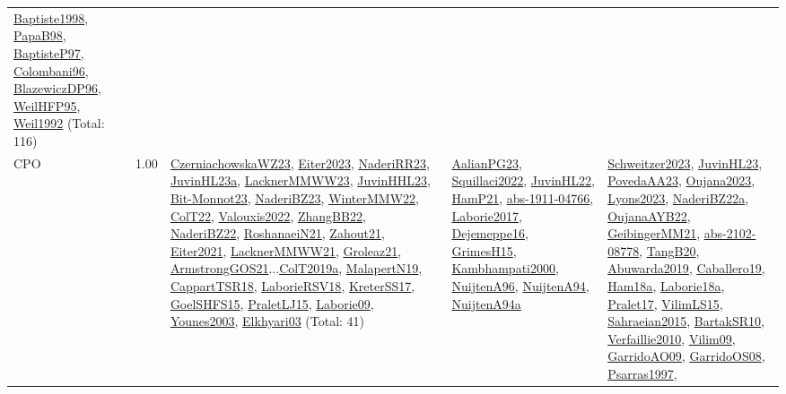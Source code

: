 {\begin{longtable}{p{3cm}r>{\raggedright\arraybackslash}p{6cm}>{\raggedright\arraybackslash}p{6cm}>{\raggedright\arraybackslash}p{8cm}}
\hyperref[detail:Baptiste1998]{Baptiste1998}, \hyperref[detail:PapaB98]{PapaB98}, \hyperref[detail:BaptisteP97]{BaptisteP97}, \hyperref[detail:Colombani96]{Colombani96}, \hyperref[detail:BlazewiczDP96]{BlazewiczDP96}, \hyperref[detail:WeilHFP95]{WeilHFP95}, \hyperref[detail:Weil1992]{Weil1992} (Total: 116)\\
\index{CPO}\index{CPSystems!CPO}CPO &  1.00 & \hyperref[detail:CzerniachowskaWZ23]{CzerniachowskaWZ23}, \hyperref[detail:Eiter2023]{Eiter2023}, \hyperref[detail:NaderiRR23]{NaderiRR23}, \hyperref[detail:JuvinHL23a]{JuvinHL23a}, \hyperref[detail:LacknerMMWW23]{LacknerMMWW23}, \hyperref[detail:JuvinHHL23]{JuvinHHL23}, \hyperref[detail:Bit-Monnot23]{Bit-Monnot23}, \hyperref[detail:NaderiBZ23]{NaderiBZ23}, \hyperref[detail:WinterMMW22]{WinterMMW22}, \hyperref[detail:ColT22]{ColT22}, \hyperref[detail:Valouxis2022]{Valouxis2022}, \hyperref[detail:ZhangBB22]{ZhangBB22}, \hyperref[detail:NaderiBZ22]{NaderiBZ22}, \hyperref[detail:RoshanaeiN21]{RoshanaeiN21}, \hyperref[detail:Zahout21]{Zahout21}, \hyperref[detail:Eiter2021]{Eiter2021}, \hyperref[detail:LacknerMMWW21]{LacknerMMWW21}, \hyperref[detail:Groleaz21]{Groleaz21}, \hyperref[detail:ArmstrongGOS21]{ArmstrongGOS21}...\hyperref[detail:ColT2019a]{ColT2019a}, \hyperref[detail:MalapertN19]{MalapertN19}, \hyperref[detail:CappartTSR18]{CappartTSR18}, \hyperref[detail:LaborieRSV18]{LaborieRSV18}, \hyperref[detail:KreterSS17]{KreterSS17}, \hyperref[detail:GoelSHFS15]{GoelSHFS15}, \hyperref[detail:PraletLJ15]{PraletLJ15}, \hyperref[detail:Laborie09]{Laborie09}, \hyperref[detail:Younes2003]{Younes2003}, \hyperref[detail:Elkhyari03]{Elkhyari03} (Total: 41) & \hyperref[detail:AalianPG23]{AalianPG23}, \hyperref[detail:Squillaci2022]{Squillaci2022}, \hyperref[detail:JuvinHL22]{JuvinHL22}, \hyperref[detail:HamP21]{HamP21}, \hyperref[detail:abs-1911-04766]{abs-1911-04766}, \hyperref[detail:Laborie2017]{Laborie2017}, \hyperref[detail:Dejemeppe16]{Dejemeppe16}, \hyperref[detail:GrimesH15]{GrimesH15}, \hyperref[detail:Kambhampati2000]{Kambhampati2000}, \hyperref[detail:NuijtenA96]{NuijtenA96}, \hyperref[detail:NuijtenA94]{NuijtenA94}, \hyperref[detail:NuijtenA94a]{NuijtenA94a} & \hyperref[detail:Schweitzer2023]{Schweitzer2023}, \hyperref[detail:JuvinHL23]{JuvinHL23}, \hyperref[detail:PovedaAA23]{PovedaAA23}, \hyperref[detail:Oujana2023]{Oujana2023}, \hyperref[detail:Lyons2023]{Lyons2023}, \hyperref[detail:NaderiBZ22a]{NaderiBZ22a}, \hyperref[detail:OujanaAYB22]{OujanaAYB22}, \hyperref[detail:GeibingerMM21]{GeibingerMM21}, \hyperref[detail:abs-2102-08778]{abs-2102-08778}, \hyperref[detail:TangB20]{TangB20}, \hyperref[detail:Abuwarda2019]{Abuwarda2019}, \hyperref[detail:Caballero19]{Caballero19}, \hyperref[detail:Ham18a]{Ham18a}, \hyperref[detail:Laborie18a]{Laborie18a}, \hyperref[detail:Pralet17]{Pralet17}, \hyperref[detail:VilimLS15]{VilimLS15}, \hyperref[detail:Sahraeian2015]{Sahraeian2015}, \hyperref[detail:BartakSR10]{BartakSR10}, \hyperref[detail:Verfaillie2010]{Verfaillie2010}, \hyperref[detail:Vilim09]{Vilim09}, \hyperref[detail:GarridoAO09]{GarridoAO09}, \hyperref[detail:GarridoOS08]{GarridoOS08}, \hyperref[detail:Psarras1997]{Psarras1997}, 
\end{longtable}}
